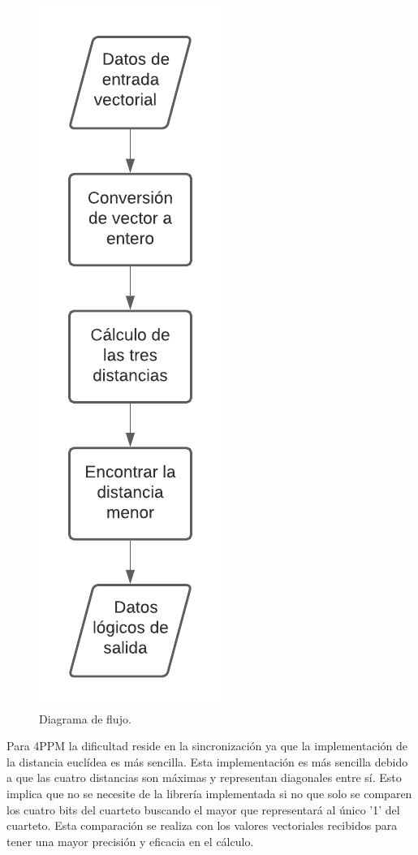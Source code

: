 \begin{figure}[ht]
    \centering
    \includegraphics[scale=0.33]{./figuras/euclidea.pdf}
    \caption{\small{Diagrama de flujo.}}
    \label{euclidea}%
\end{figure}

Para 4PPM la dificultad reside en la sincronización ya que la implementación de la 
distancia euclídea es más sencilla. Esta implementación es más sencilla debido a que 
las cuatro distancias son máximas y representan diagonales entre sí. Esto implica que
no se necesite de la librería implementada si no que solo se comparen los cuatro bits
del cuarteto buscando el mayor que representará al único '1' del cuarteto. Esta 
comparación se realiza con los valores vectoriales recibidos para tener una mayor
precisión y eficacia en el cálculo.


